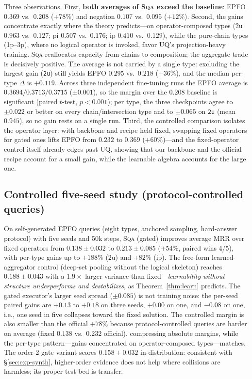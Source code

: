 \documentclass[journal]{IEEEtran}
\newcommand{\SQA}{\textsc{Sqa}}
\begin{document}
Three observations. First, \textbf{both averages of \SQA{} exceed the
baseline}: EPFO $0.369$ vs.\ $0.208$ ($+78\%$) and negation $0.107$ vs.\
$0.095$ ($+12\%$). Second, the gains concentrate exactly where the theory
predicts---on operator-composed types (2u $0.963$ vs.\ $0.127$; pi $0.507$
vs.\ $0.176$; ip $0.410$ vs.\ $0.129$), while the pure-chain types (1p--3p),
where no logical operator is invoked, favor UQ's projection-heavy training.
\SQA{} reallocates capacity from chains to composition; the aggregate
trade is decisively positive. The average is not carried by a single
type: excluding the largest gain (\texttt{2u}) still yields EPFO
$0.295$ vs.\ $0.218$ ($+36\%$), and the median per-type $\Delta$ is
$+0.119$. Across three independent fine-tuning runs
the EPFO average is $0.3694/0.3713/0.3715$ ($\pm 0.001$), so the margin over the $0.208$ baseline is significant (paired $t$-test, $p < 0.001$); per type, the three checkpoints agree to $\pm 0.022$ or better on every chain/intersection type and to $\pm 0.065$ on \texttt{2u} (mean $0.945$), so no gain rests on a single run. Third, the controlled comparison isolates the
operator layer: with backbone and recipe held fixed, swapping fixed
operators for gated ones lifts EPFO from $0.232$ to $0.369$ ($+60\%$)---and
the fixed-operator control itself already edges past UQ, showing that our
backbone and the official recipe account for a small gain, while the
learnable algebra accounts for the large one.

\subsection{Controlled five-seed study (protocol-controlled queries)}
\label{sec:exp-main}

On self-generated EPFO queries (eight types, anchored sampling, hard-answer
protocol) with five seeds and 50k steps, \SQA{} (gated) improves average
MRR over fixed operators from $0.138\pm0.032$ to $0.213\pm0.085$
($+54\%$, paired wins 4/5), with per-type gains up to $+188\%$ (2u) and
$+82\%$ (ip). The free-form learned-aggregator control (deep-set pooling
without the logical skeleton) reaches $0.188\pm0.043$ with a $1.9\times$
larger variance than fixed---\emph{learnability without structure
underperforms and destabilizes}, as Theorem~\ref{thm:learn} predicts.
The gated executor's larger seed spread ($\pm0.085$) is not training
noise: the per-seed paired gains are $+0.13$ to $+0.18$ on three seeds,
$+0.00$ on one, and $-0.08$ on one, i.e., one seed in five collapses
toward the fixed solution. The controlled margin is also smaller than
the official $+78\%$ because protocol-controlled queries are harder on
average (fixed $0.138$ vs.\ $0.232$ official), compressing absolute
margins, while the per-type pattern---gains concentrated on
operator-composed types---matches. The order-2 gate
variant scores $0.158\pm0.032$ in-distribution: consistent with
\S\ref{sec:exp-synth}, higher-order evidence does not help where collisions
are harmless; its proper test bed is transfer.
\end{document}
